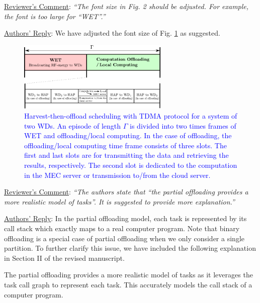 \documentclass[12pt,draftclsnofoot,onecolumn]{IEEEtran}
\newcommand{\rev}[1]{{\color{blue}#1}} %
\newcommand{\rev}[1]{#1}
\newenvironment{my}[2]%
{\begin{list}{}%
{\setlength{\rightmargin}{#1}\setlength{\leftmargin}{#2}}%


 \item[]{}

} {\end{list}}
\begin{document}
\begin{enumerate}
	
	\item \underline{Reviewer's Comment}: \textit{``The font size in Fig. 2 should be adjusted. For example, the font is too large for ``WET''.''} \newline
	
	\underline{Authors' Reply}: We have adjusted the font size of Fig. \ref{fig2r} as suggested. \newline
	
	\renewcommand{\figurename}{Fig.}
	\renewcommand{\thefigure}{2}
	\begin{my}{1cm}{1cm}
		\rev{
			\begin{figure}[h!]
				\centering
				\includegraphics[height=95pt]{TDMA.pdf}
				\caption{\textcolor{blue}{Harvest-then-offload scheduling with TDMA protocol for a system of two WDs. An episode of length $\Gamma$ is divided into two times frames of WET and offloading/local computing. In the case of offloading, the offloading/local computing time frame consists of three slots. The first and last slots are for transmitting the data and retrieving the results, respectively. The second slot is dedicated to the computation in the MEC server or transmission to/from the cloud server.}}\label{fig2r}
			\end{figure}
		}
	\end{my}
	
	\item \underline{Reviewer's Comment}: \textit{``The authors state that “the partial offloading provides a more realistic model of tasks”. It is suggested to provide more explanation.''}\newline
	
	\underline{Authors' Reply}: In the partial offloading model, each task is represented by its call stack which exactly maps to a real computer program. Note that binary offloading is a special case of partial offloading when we only consider a single partition. To further clarify this issue, we have included the following explanation in Section II of the revised manuscript.\newline
	
	\begin{my}{1cm}{1cm}
		\rev{
			The partial offloading provides a more realistic model of tasks as it leverages the task call graph to represent each task. This accurately models the call stack of a computer program.\newline
		}
	\end{my}


\end{enumerate}
\end{document}
